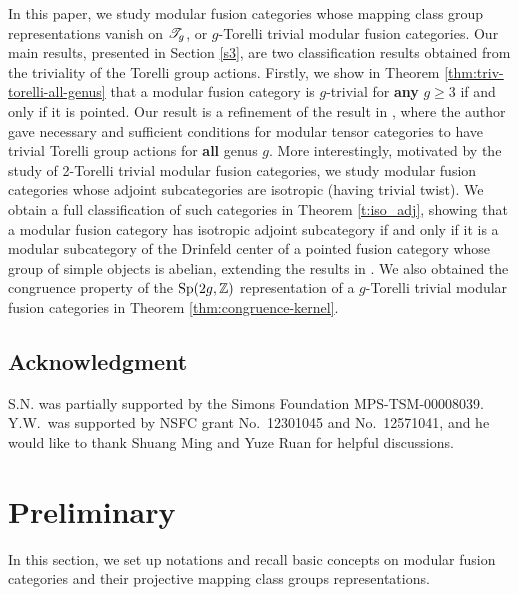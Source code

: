 \documentclass[11pt]{article}
\begin{document}
In this paper, we study modular fusion categories whose mapping class group representations vanish on $\mathscr{T}_{g}$, or $g$-Torelli trivial modular fusion categories. Our main results, presented in Section \ref{s3}, are two classification results obtained from the triviality of the Torelli group actions. Firstly, we show in Theorem \ref{thm:triv-torelli-all-genus} that a modular fusion category is $g$-trivial for \textbf{any} $g \ge 3$ if and only if it is pointed. Our result is a refinement of the result in \cite[Prop.~6.7]{MW25}, where the author gave necessary and sufficient conditions for modular tensor categories to have trivial Torelli group actions for \textbf{all} genus $g$. More interestingly, motivated by the study of 2-Torelli trivial modular fusion categories, we study modular fusion categories whose adjoint subcategories are isotropic (having trivial twist). We obtain a full classification of such categories in Theorem \ref{t:iso_adj}, showing that a modular fusion category has isotropic adjoint subcategory if and only if it is a modular subcategory of the Drinfeld center of a pointed fusion category whose group of simple objects is abelian, extending the results in \cite{FF20}. We also obtained the congruence property of the ${\operatorname{Sp}}(2g, {\mathbb{Z}})$ representation of a $g$-Torelli trivial modular fusion categories in Theorem \ref{thm:congruence-kernel}.

\subsection*{Acknowledgment}
S.N. was partially supported by the Simons Foundation MPS-TSM-00008039. Y.W.~was supported by NSFC grant No.\ 12301045 and No.\ 12571041, and he would like to thank Shuang Ming and Yuze Ruan for helpful discussions. 



\section{Preliminary}
In this section, we set up notations and recall basic concepts on modular fusion categories and their projective mapping class groups representations.
\end{document}
